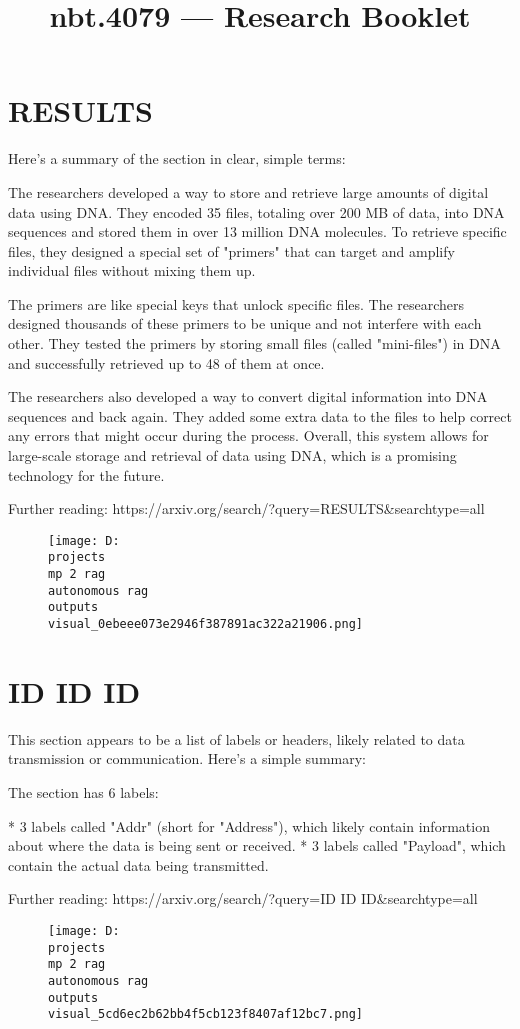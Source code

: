 \documentclass[12pt,a4paper]{article}
\title{nbt.4079 — Research Booklet}
\date{}
\begin{document}
\maketitle
\tableofcontents
\newpage
\section{RESULTS}
Here's a summary of the section in clear, simple terms:

The researchers developed a way to store and retrieve large amounts of digital data using DNA. They encoded 35 files, totaling over 200 MB of data, into DNA sequences and stored them in over 13 million DNA molecules. To retrieve specific files, they designed a special set of "primers" that can target and amplify individual files without mixing them up.

The primers are like special keys that unlock specific files. The researchers designed thousands of these primers to be unique and not interfere with each other. They tested the primers by storing small files (called "mini-files") in DNA and successfully retrieved up to 48 of them at once.

The researchers also developed a way to convert digital information into DNA sequences and back again. They added some extra data to the files to help correct any errors that might occur during the process. Overall, this system allows for large-scale storage and retrieval of data using DNA, which is a promising technology for the future.

Further reading: https://arxiv.org/search/?query=RESULTS&searchtype=all
\begin{figure}[h]
\centering
\texttt{[image: D:\\projects\\mp 2 rag\\autonomous rag\\outputs\\visual\_0ebeee073e2946f387891ac322a21906.png]}
\end{figure}
\section{ID
ID
ID}
This section appears to be a list of labels or headers, likely related to data transmission or communication. Here's a simple summary:

The section has 6 labels:

* 3 labels called "Addr" (short for "Address"), which likely contain information about where the data is being sent or received.
* 3 labels called "Payload", which contain the actual data being transmitted.

Further reading: https://arxiv.org/search/?query=ID
ID
ID&searchtype=all
\begin{figure}[h]
\centering
\texttt{[image: D:\\projects\\mp 2 rag\\autonomous rag\\outputs\\visual\_5cd6ec2b62bb4f5cb123f8407af12bc7.png]}
\end{figure}
\end{document}

